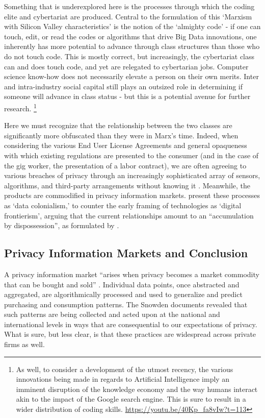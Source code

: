 Something that is underexplored here is the processes through which
the coding elite and cybertariat are produced. Central to the
formulation of this `Marxism with Silicon Valley characteristics' is
the notion of the `almighty code' - if one can touch, edit, or read
the codes or algorithms that drive Big Data innovations, one
inherently has more potential to advance through class structures than
those who do not touch code. This is mostly correct, but increasingly,
the cybertariat class can and does touch code, and yet are relegated
to cybertarian jobs. Computer science know-how does not necessarily
elevate a person on their own merits. Inter and intra-industry social
capital still plays an outsized role in determining if someone will
advance in class status - but this is a potential avenue for further
research. \footnote{As well, to consider a development of the utmost
recency, the various innovations being made in regards to Artificial
Intelligence imply an imminent disruption of the knowledge economy and
the way humans interact akin to the impact of the Google search
engine. This is sure to result in a wider distribution of coding
skills. \url{https://youtu.be/40Kp_fa8vIw?t=113}}

Here we must recognize that the relationship between the two classes
are significantly more obfuscated than they were in Marx's
time. Indeed, when considering the various End User License Agreements
and general opaqueness with which existing regulations are presented
to the consumer (and in the case of the gig worker, the presentation
of a labor contract), we are often agreeing to various breaches of
privacy through an increasingly sophisticated array of sensors,
algorithms, and third-party arrangements without knowing it
\citep{thatcher2016DataColonialism}. Meanwhile, the products are
commodified in privacy information markets.
\cite{thatcher2016DataColonialism} present these processes as
`data colonialism,' to counter the early framing of technologies as
`digital frontierism', arguing that the current relationships amount
to an ``accumulation by dispossession'', as formulated
by \cite{harvey2003NewImperialism}.

\subsection{Privacy Information Markets and Conclusion}
A privacy information market ``arises when privacy becomes a market
commodity that can be bought and sold'' \citep{crampton2015CollectIt}.
Individual data points, once abstracted and aggregated, are
algorithmically processed and used to generalize and predict
purchasing and consumption patterns. The Snowden documents revealed
that such patterns are being collected and acted upon at the national
and international levels in ways that are consequential to our
expectations of privacy. What is sure, but less clear, is that these
practices are widespread across private firms as well.

